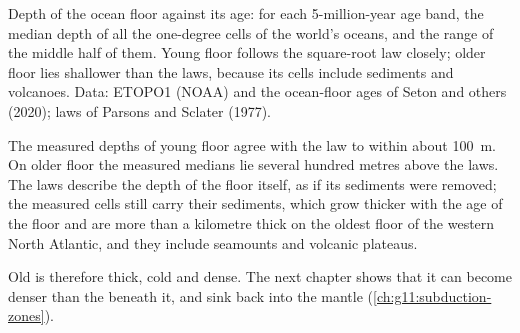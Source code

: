 \begin{omfigure}

{\small Depth of the ocean floor against its age: for each 5-million-year age
band, the median depth of all the one-degree cells of the world's oceans,
and the range of the middle half of them. Young floor follows the
square-root law closely; older floor lies shallower than the laws, because
its cells include sediments and volcanoes. Data: ETOPO1 (NOAA) and the
ocean-floor ages of Seton and others (2020); laws of Parsons and Sclater
(1977).}
\end{omfigure}

The measured depths of young floor agree with the law to within about
\qty{100}{m}. On older floor the measured medians lie several hundred metres
above the laws. The laws describe the depth of the floor itself, as if its
sediments were removed; the measured cells still carry their sediments,
which grow thicker with the age of the floor and are more than a kilometre
thick on the oldest floor of the western North Atlantic, and they include
seamounts and volcanic plateaus.

Old  is therefore thick, cold and dense. The next chapter
shows that it can become denser than the  beneath it, and sink
back into the mantle (\cref{ch:g11:subduction-zones}).

